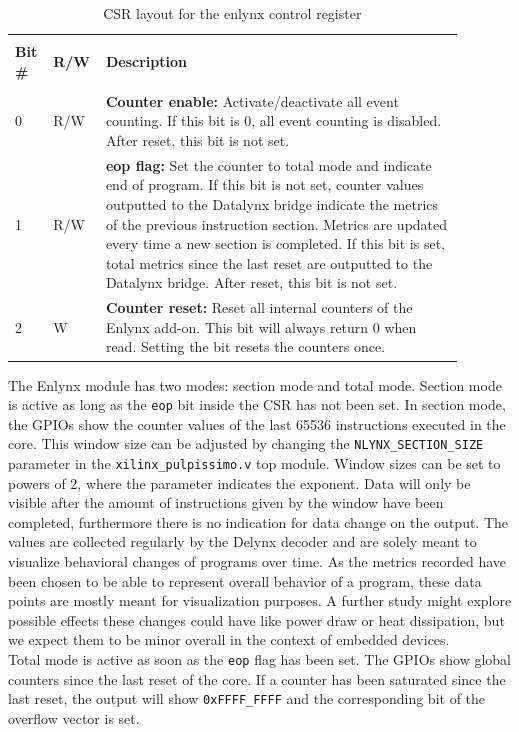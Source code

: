 \documentclass[../bachelor_paper.tex]{subfiles}
\begin{document}
\begin{table}
    \begin{tabular}{p{0.07\linewidth} p{0.07\linewidth} p{0.75\linewidth}}
        \hline \\[-0.9em]
        \textbf{Bit \#}  & \textbf{R/W}  & \textbf{Description} \\
        \hline \\[-0.9em]
        0               & R/W           & \textbf{Counter enable:} Activate/deactivate all event counting. If this bit is 0, all event counting is disabled. After reset, this bit is not set.\\
        1               & R/W           & \textbf{eop flag:} Set the counter to total mode and indicate end of program. If this bit is not set, counter values outputted to the Datalynx bridge indicate the metrics of the previous instruction section. Metrics are updated every time a new section is completed. If this bit is set, total metrics since the last reset are outputted to the Datalynx bridge. After reset, this bit is not set.\\
        2               & W             & \textbf{Counter reset:} Reset all internal counters of the Enlynx add-on. This bit will always return 0 when read. Setting the bit resets the counters once.\\
        \hline
    \end{tabular}
    \caption{\ac{CSR} layout for the enlynx control register}
    \label{tab:arch/enl/csrlayout}
\end{table}

The Enlynx module has two modes: section mode and total mode. Section mode is active as long as the \texttt{eop} bit inside the \ac{CSR} has not been set. In section mode, the GPIOs show the counter values of the last 65536
instructions executed in the core. This window size can be adjusted by changing the \texttt{NLYNX\_SECTION\_SIZE} parameter in the \texttt{xilinx\_pulpissimo.v} top module. Window sizes can be set to powers of 2, where the parameter indicates the exponent. Data will only be visible after the amount of instructions given by the window have been completed, furthermore there is no indication for data change on the output. The values are collected regularly by the Delynx decoder and are solely meant to visualize behavioral changes of programs over time. As the metrics recorded have been chosen to be able to represent overall behavior of a program, these data points are mostly meant for visualization purposes. A further study might explore possible effects these changes could have like power draw or heat dissipation, but we expect them to be minor overall in the context of embedded devices.\\
Total mode is active as soon as the \texttt{eop} flag has been set. The GPIOs show global counters since the last reset of the core. If a counter has been saturated since the last reset, the output will show \texttt{0xFFFF\_FFFF} and the corresponding bit of the overflow vector is set.
\end{document}
